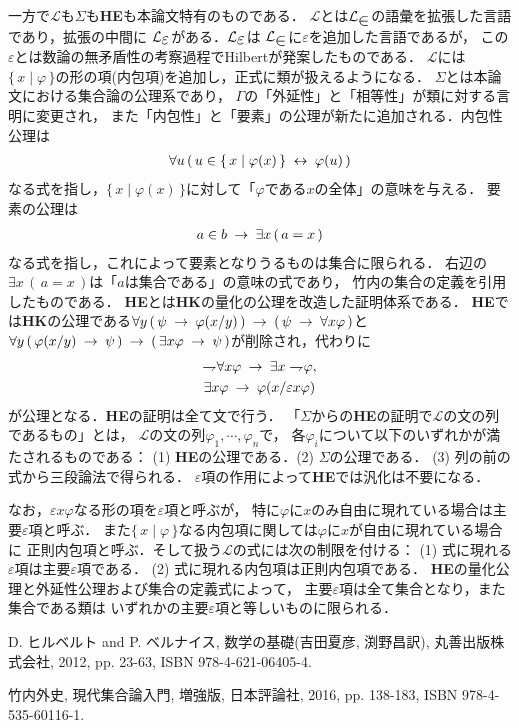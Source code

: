 \documentclass[twocolumn,10pt]{jsarticle}
\theoremstyle{mystyle}
\newcommand{\lang}[1]{\mathcal{L}_{\scalebox{1.2}{$#1$}}} %
\newcommand{\Set}[2]{\{\, #1 \mid #2\, \}} %
\newcommand{\negation}{\rightharpoondown\hspace{-0.25em}} %
\newcommand{\rarrow}{\hspace{0.25em}\rightarrow\hspace{0.25em}} %
\newcommand{\lrarrow}{\hspace{0.25em}\leftrightarrow\hspace{0.25em}} %
\begin{document}
	一方で$\mathcal{L}$も$\Sigma$も{\bf HE}も本論文特有のものである．
	$\mathcal{L}$とは$\lang{\in}$の語彙を拡張した言語であり，拡張の中間に
	$\lang{\varepsilon}$がある．$\lang{\varepsilon}$は
	$\lang{\in}$に$\varepsilon$を追加した言語であるが，
	この$\varepsilon$とは数論の無矛盾性の考察過程でHilbert\cite{Hilbert}が発案したものである．
	$\mathcal{L}$には$\Set{x}{\varphi}$の形の項(内包項)を追加し，正式に類が扱えるようになる．
	$\Sigma$とは本論文における集合論の公理系であり，
	$\Gamma$の「外延性」と「相等性」が類に対する言明に変更され，
	また「内包性」と「要素」の公理が新たに追加される．内包性公理は
	\begin{align}
		\forall u\, (\, u \in \Set{x}{\varphi(x)} \lrarrow \varphi(u)\, )
	\end{align}
	なる式を指し，$\Set{x}{\varphi(x)}$に対して「$\varphi$である$x$の全体」の意味を与える．
	要素の公理は
	\begin{align}
		a \in b \rarrow \exists x\, (\, a = x\, )
	\end{align}
	なる式を指し，これによって要素となりうるものは集合に限られる．
	右辺の$\exists x\, (\, a = x\, )$は「$a$は集合である」の意味の式であり，
	竹内\cite{TakeuchiSet}の集合の定義を引用したものである．
	{\bf HE}とは{\bf HK}の量化の公理を改造した証明体系である．
	{\bf HE}では{\bf HK}の公理である$\forall y\, (\, \psi \rarrow \varphi(x/y)\, )
	\rarrow (\, \psi \rarrow \forall x \varphi\, )$と
	$\forall y\, (\, \varphi(x/y) \rarrow \psi\, )
	\rarrow (\, \exists x \varphi \rarrow \psi\, )$が削除され，代わりに
	\begin{align}
		\begin{gathered}
			\negation \forall x \varphi \rarrow \exists x \negation \varphi, \\
			\exists x \varphi \rarrow \varphi(x/\varepsilon x \varphi)
		\end{gathered}
	\end{align}
	が公理となる．{\bf HE}の証明は全て文で行う．
	「$\Sigma$からの{\bf HE}の証明で$\mathcal{L}$の文の列であるもの」とは，
	$\mathcal{L}$の文の列$\varphi_{1},\cdots,\varphi_{n}$で，
	各$\varphi_{i}$について以下のいずれかが満たされるものである：
	(1) {\bf HE}の公理である．(2) $\Sigma$の公理である．
	(3) 列の前の式から三段論法で得られる．
	$\varepsilon$項の作用によって{\bf HE}では汎化は不要になる．
	
	なお，$\varepsilon x \varphi$なる形の項を$\varepsilon$項と呼ぶが，
	特に$\varphi$に$x$のみ自由に現れている場合は主要$\varepsilon$項と呼ぶ．
	また$\Set{x}{\varphi}$なる内包項に関しては$\varphi$に$x$が自由に現れている場合に
	正則内包項と呼ぶ．そして扱う$\mathcal{L}$の式には次の制限を付ける：
	(1) 式に現れる$\varepsilon$項は主要$\varepsilon$項である．
	(2) 式に現れる内包項は正則内包項である．
	{\bf HE}の量化公理と外延性公理および集合の定義式によって，
	主要$\varepsilon$項は全て集合となり，また集合である類は
	いずれかの主要$\varepsilon$項と等しいものに限られる．
	
	\begin{thebibliography}{数字}
		 D. ヒルベルト and P. ベルナイス, 数学の基礎(吉田夏彦, 渕野昌訳), 丸善出版株式会社, 2012, pp. 23-63, ISBN 978-4-621-06405-4.
	
		 竹内外史, 現代集合論入門, 増強版, 日本評論社, 2016, pp. 138-183, ISBN 978-4-535-60116-1.
	\end{thebibliography}
\end{document}
